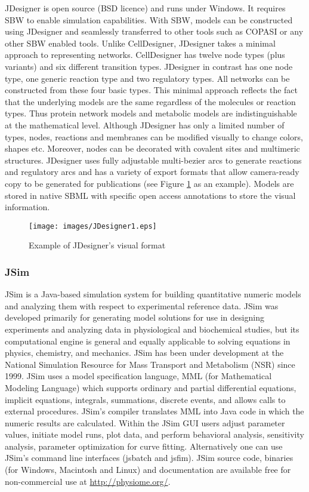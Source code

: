 JDesigner \autocite{BergmannCP:2006} is open
source (BSD licence) and runs under Windows. It requires SBW to enable
simulation capabilities. With SBW, models can be constructed using
JDesigner and seamlessly transferred to other tools such as COPASI or
any other SBW enabled tools. Unlike CellDesigner, JDesigner takes a
minimal approach to representing networks. CellDesigner has twelve node
types (plus variants) and six different transition types. JDesigner in
contrast has one node type, one generic reaction type and two regulatory
types. All networks can be constructed from these four basic types. This
minimal approach reflects the fact that the underlying models are the
same regardless of the molecules or reaction types. Thus protein network
models and metabolic models are indistinguishable at the mathematical
level. Although JDesigner has only a limited number of types, nodes,
reactions and membranes can be modified visually to change colors,
shapes etc. Moreover, nodes can be decorated with covalent sites and
multimeric structures. JDesigner uses fully adjustable multi-bezier arcs
to generate reactions and regulatory arcs and has a variety of export
formats that allow camera-ready copy to be generated for publications
(see Figure \ref{Figure:jdesigner} as an example). Models are stored in
native SBML with specific open access annotations to store the visual
information.

\begin{figure}[htbp]
\centering
\texttt{[image: images/JDesigner1.eps]}
\caption{Example of JDesigner's visual format\label{Figure:jdesigner}}
\end{figure}

\subsubsection{JSim \label{jsim}}

JSim \autocite{raymond03} is a Java-based simulation system for building
quantitative numeric models and analyzing them with respect to
experimental reference data. JSim was developed primarily for generating
model solutions for use in designing experiments and analyzing data in
physiological and biochemical studies, but its computational engine is
general and equally applicable to solving equations in physics,
chemistry, and mechanics. JSim has been under development at the
National Simulation Resource for Mass Transport and Metabolism (NSR)
since 1999. JSim uses a model specification language, MML (for
Mathematical Modeling Language) which supports ordinary and partial
differential equations, implicit equations, integrals, summations,
discrete events, and allows calls to external procedures. JSim's
compiler translates MML into Java code in which the numeric results are
calculated. Within the JSim GUI users adjust parameter values, initiate
model runs, plot data, and perform behavioral analysis, sensitivity
analysis, parameter optimization for curve fitting. Alternatively one
can use JSim's command line interfaces (jsbatch and jsfim). JSim source
code, binaries (for Windows, Macintosh and Linux) and documentation are
available free for non-commercial use at \url{http://physiome.org/}.

